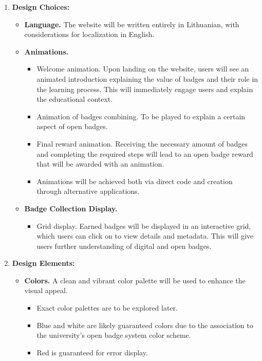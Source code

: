 \begin{enumerate}
    \item \textbf{Design Choices:}
    \begin{itemize}
        \item \textbf{Language.} The website will be written entirely in Lithuanian, with considerations for localization in English.
        \item \textbf{Animations.}
        \begin{itemize}
            \item Welcome animation. Upon landing on the website, users will see an animated introduction explaining the value of badges and their role in the learning process. 
            This will immediately engage users and explain the educational context.
            \item Animation of badges combining. To be played to explain a certain aspect of open badges.
            \item Final reward animation. Receiving the necessary amount of badges and completing the required steps will lead to an open badge reward that will be awarded with an animation.
            \item Animations will be achieved both via direct code and creation through alternative applications.
        \end{itemize}
        \item \textbf{Badge Collection Display.}
        \begin{itemize}
            \item Grid display. Earned badges will be displayed in an interactive grid, which users can click on to view details and metadata. 
            This will give users further understanding of digital and open badges.
        \end{itemize}
    \end{itemize}
    \item \textbf{Design Elements:}
    \begin{itemize}
        \item \textbf{Colors.} A clean and vibrant color palette will be used to enhance the visual appeal. 
            \begin{itemize}
            \item Exact color palettes are to be explored later. 
            \item Blue and white are likely guaranteed colors due to the association to the university's open badge system color scheme. 
            \item Red is guaranteed for error display.

\end{itemize}
\end{itemize}
\end{enumerate}
